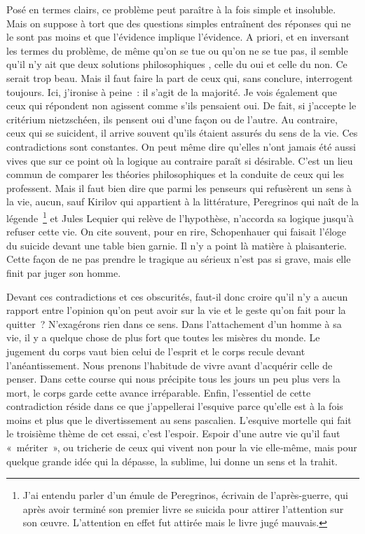 \documentclass{book}
\begin{document}
Posé en termes clairs, ce problème peut paraître à la fois simple et insoluble. Mais on suppose à tort que des questions simples entraînent des réponses qui ne le sont pas moins et que l'évidence implique l'évidence. A priori, et en inversant les termes du problème, de même qu'on se tue ou qu'on ne se tue pas, il semble qu'il n'y ait que deux solutions philosophiques , celle du oui et celle du non. Ce serait trop beau. Mais il faut faire la part de ceux qui, sans conclure, interrogent toujours. Ici, j'ironise à peine : il s'agit de la majorité. Je vois également que ceux qui répondent non agissent comme s'ils pensaient oui. De fait, si j'accepte le critérium nietzschéen, ils pensent oui d'une façon ou de l'autre. Au contraire, ceux qui se suicident, il arrive souvent qu'ils étaient assurés du sens de la vie. Ces contradictions sont constantes. On peut même dire qu'elles n'ont jamais été aussi vives que sur ce point où la logique au contraire paraît si désirable. C'est un lieu commun de comparer les théories philosophiques et la conduite de ceux qui les professent. Mais il faut bien dire que parmi les penseurs qui refusèrent un sens à la vie, aucun, sauf Kirilov qui appartient à la littérature, Peregrinos qui naît de la légende \footnote{J’ai entendu parler d’un émule de Peregrinos, écrivain de l’après‑guerre, qui après avoir terminé son premier livre se suicida pour attirer l’attention sur son œuvre. L’attention en effet fut attirée mais le livre jugé mauvais.} et Jules Lequier qui relève de l'hypothèse, n'accorda sa logique jusqu'à refuser cette vie. On cite souvent, pour en rire, Schopenhauer qui faisait l'éloge du suicide devant une table bien garnie. Il n'y a point là matière à plaisanterie. Cette façon de ne pas prendre le tragique au sérieux n'est pas si grave, mais elle finit par juger son homme.

Devant ces contradictions et ces obscurités, faut-il donc croire qu'il n'y a aucun rapport entre l'opinion qu'on peut avoir sur la vie et le geste qu'on fait pour la quitter ? N'exagérons rien dans ce sens. Dans l'attachement d'un homme à sa vie, il y a quelque chose de plus fort que toutes les misères du monde. Le jugement du corps vaut bien celui de l'esprit et le corps recule devant l'anéantissement. Nous prenons l'habitude de vivre avant d'acquérir celle de penser. Dans cette course qui nous précipite tous les jours un peu plus vers la mort, le corps garde cette avance irréparable. Enfin, l'essentiel de cette contradiction réside dans ce que j'appellerai l'esquive parce qu'elle est à la fois moins et plus que le divertissement au sens pascalien. L'esquive mortelle qui fait le troisième thème de cet essai, c'est l'espoir. Espoir d'une autre vie qu'il faut « mériter », ou tricherie de ceux qui vivent non pour la vie elle‑même, mais pour quelque grande idée qui la dépasse, la sublime, lui donne un sens et la trahit.
\end{document}
